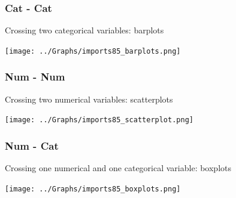\begin{frame}
\frametitle{Cat - Cat}
Crossing two categorical variables: barplots 
\begin{center}
\texttt{[image: ../Graphs/imports85\_barplots.png]}
\end{center}
\end{frame}
\begin{frame}
\frametitle{Num - Num}
Crossing two numerical variables: scatterplots 
\begin{center}
\texttt{[image: ../Graphs/imports85\_scatterplot.png]}
\end{center}
\end{frame}
\begin{frame}
\frametitle{Num - Cat}
Crossing one numerical and one categorical variable: boxplots 
\begin{center}
\texttt{[image: ../Graphs/imports85\_boxplots.png]}
\end{center}
\end{frame}
